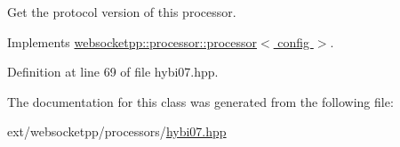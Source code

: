 Get the protocol version of this processor. 



Implements \hyperlink{classwebsocketpp_1_1processor_1_1processor_af415ca67d51a90339ce57763b497f834}{websocketpp\+::processor\+::processor$<$ config $>$}.



Definition at line 69 of file hybi07.\+hpp.



The documentation for this class was generated from the following file\+:\begin{DoxyCompactItemize}
\item 
ext/websocketpp/processors/\hyperlink{hybi07_8hpp}{hybi07.\+hpp}\end{DoxyCompactItemize}
